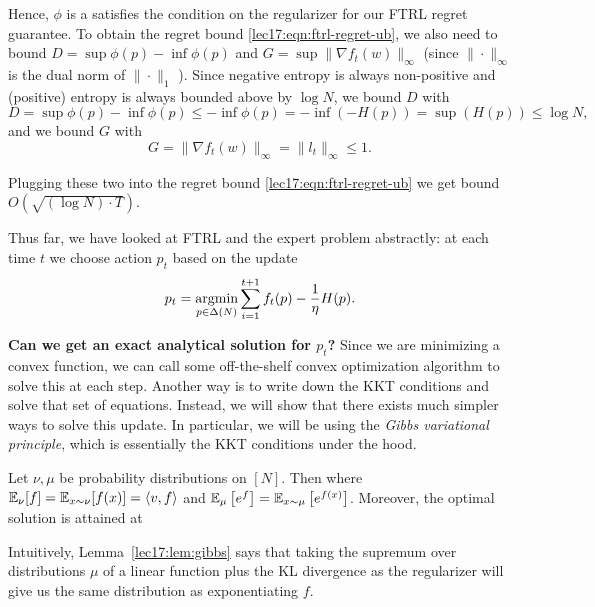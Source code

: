 Hence, $\phi$ is a satisfies the condition on the regularizer for our FTRL regret guarantee. To obtain the regret bound \eqref{lec17:eqn:ftrl-regret-ub}, we also need to bound $D = \sup \phi(p) - \inf \phi(p)$ and $G = \sup \|\nabla f_t(w)\|_\infty$ (since $\|\cdot\|_\infty$ is the dual norm of $\|\cdot \|_1$ ). Since negative entropy is always non-positive and (positive) entropy is always bounded above by $\log N$, we bound $D$ with
\begin{equation} 
D = \sup \phi(p) - \inf \phi(p) \leq -\inf \phi (p) = -\inf (-H(p)) = \sup (H(p)) \leq \log N,
\end{equation}
and we bound $G$ with
\begin{equation}
G = \|\nabla f_t(w)\|_\infty = \|l_t\|_\infty \leq 1.
\end{equation}

Plugging these two into the regret bound \eqref{lec17:eqn:ftrl-regret-ub} we get bound $O(\sqrt{(\log N) \cdot T})$. 

Thus far, we have looked at FTRL and the expert problem abstractly: at each time $t$ we choose action $p_t$ based on the update
\begin{equation}
p_t = \operatorname*{\textup{argmin}}_{p \in \Delta(N)} \sum_{i=1}^{t+1} f_t(p) - \frac{1}{\eta} H(p).
\end{equation}

\textbf{Can we get an exact analytical solution for $p_t$?} Since we are minimizing a convex function, we can call some off-the-shelf convex optimization algorithm to solve this at each step. Another way is to write down the KKT conditions and solve that set of equations.  Instead, we will show that there exists much simpler ways to solve this update. In particular, we will be using the \textit{Gibbs variational principle}, which is essentially the KKT conditions under the hood.

\begin{lemma} \label{lec17:lem:gibbs}
Let $\nu, \mu$ be probability distributions on $[N]$. Then 
 where $\mathbb{E}_\nu[f] = \mathbb{E}_{x \sim \nu} [f(x)] = \langle v, f\rangle$ and $\mathbb{E}_\mu \left[e^f\right] = \mathbb{E}_{x \sim \mu}  \left[e^{f(x)}\right]$. Moreover, the optimal solution is attained at 
\end{lemma}

Intuitively, Lemma~\ref{lec17:lem:gibbs} says that taking the supremum over distributions $\mu$ of a linear function plus the KL divergence as the regularizer will give us the same distribution as exponentiating $f$. 

